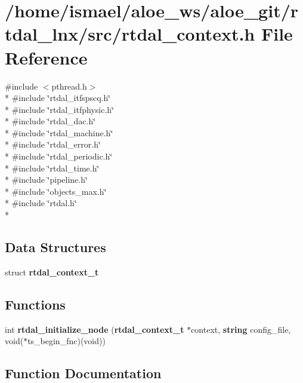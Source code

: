 \section{/home/ismael/aloe\-\_\-ws/aloe\-\_\-git/rtdal\-\_\-lnx/src/rtdal\-\_\-context.h File Reference}
\label{rtdal__context_8h}
{\ttfamily \#include $<$pthread.\-h$>$}\\*
{\ttfamily \#include \char`\"{}rtdal\-\_\-itfspscq.\-h\char`\"{}}\\*
{\ttfamily \#include \char`\"{}rtdal\-\_\-itfphysic.\-h\char`\"{}}\\*
{\ttfamily \#include \char`\"{}rtdal\-\_\-dac.\-h\char`\"{}}\\*
{\ttfamily \#include \char`\"{}rtdal\-\_\-machine.\-h\char`\"{}}\\*
{\ttfamily \#include \char`\"{}rtdal\-\_\-error.\-h\char`\"{}}\\*
{\ttfamily \#include \char`\"{}rtdal\-\_\-periodic.\-h\char`\"{}}\\*
{\ttfamily \#include \char`\"{}rtdal\-\_\-time.\-h\char`\"{}}\\*
{\ttfamily \#include \char`\"{}pipeline.\-h\char`\"{}}\\*
{\ttfamily \#include \char`\"{}objects\-\_\-max.\-h\char`\"{}}\\*
{\ttfamily \#include \char`\"{}rtdal.\-h\char`\"{}}\\*
\subsection*{Data Structures}
\begin{DoxyCompactItemize}
\item 
struct {\bf rtdal\-\_\-context\-\_\-t}
\end{DoxyCompactItemize}
\subsection*{Functions}
\begin{DoxyCompactItemize}
\item 
int {\bf rtdal\-\_\-initialize\-\_\-node} ({\bf rtdal\-\_\-context\-\_\-t} $\ast$context, {\bf string} config\-\_\-file, void($\ast$ts\-\_\-begin\-\_\-fnc)(void))
\end{DoxyCompactItemize}


\subsection{Function Documentation}
